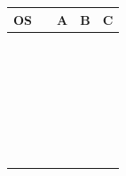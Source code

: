 \documentclass{article}
\begin{document}
\renewcommand\arraystretch{1.8}%
\begin{tabular}{|p{1in}|p{0.3in}|p{1in}|p{1in}|p{1in}|}
\hline
OS      &  & A & B & C \\ \hline
        &  &   &   &   \\ \hline
        &  &   &   &   \\ \hline
        &  &   &   &   \\ \hline
        &  &   &   &   \\ \hline
        &  &   &   &   \\ \hline
        &  &   &   &   \\ \hline
        &  &   &   &   \\ \hline
        &  &   &   &   \\ \hline
        &  &   &   &   \\ \hline
        &  &   &   &   \\ \hline
        &  &   &   &   \\ \hline
        &  &   &   &   \\ \hline
        &  &   &   &   \\ \hline
        &  &   &   &   \\ \hline
        &  &   &   &   \\ \hline
        &  &   &   &   \\ \hline
        &  &   &   &   \\ \hline
        &  &   &   &   \\ \hline
        &  &   &   &   \\ \hline
        &  &   &   &   \\ \hline
        &  &   &   &   \\ \hline
        &  &   &   &   \\ \hline
        &  &   &   &   \\ \hline
        &  &   &   &   \\ \hline
        &  &   &   &   \\ \hline
        &  &   &   &   \\ \hline
        &  &   &   &   \\ \hline
        &  &   &   &   \\ \hline
        &  &   &   &   \\ \hline

\end{tabular}
\newpage
\end{document}
